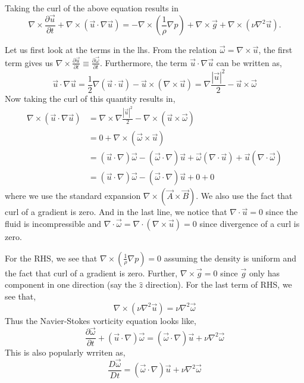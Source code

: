 \documentclass[aps,pra,a4paper,twocolumn,longbibliography,groupedaddress]{revtex4-2}
\begin{document}
Taking the curl of the above equation results in
\begin{equation}
    \nabla \times \frac{\partial \vec{u}}{\partial t} + \nabla \times (\vec{u} \cdot \nabla \vec{u}) = -\nabla \times (\frac{1}{\rho}\nabla p) + \nabla \times \vec{g} + \nabla \times (\nu\nabla^2 \vec{u}).
\end{equation}

Let us first look at the terms in the \gls{lhs}. From the relation $\vec{\omega} = \nabla \times \vec{u}$, the first term gives us $\nabla \times \frac{\partial \vec{u}}{\partial t} \equiv \frac{\partial \vec{\omega}}{\partial t}$. Furthermore, the term $\vec{u} \cdot \nabla \vec{u}$ can be written as,
\begin{equation}
    \vec{u} \cdot \nabla \vec{u} = \frac{1}{2} \nabla (\vec{u}\cdot \vec{u}) - \vec{u} \times (\nabla \times \vec{u}) = \nabla\frac{|\vec{u}|^2}{2} - \vec{u}\times \vec{\omega}
\end{equation}
Now taking the curl of this quantity results in,
\begin{equation}
\begin{split}
     \nabla \times (\vec{u} \cdot \nabla \vec{u}) &= \nabla \times \nabla\frac{|\vec{u}|^2}{2} - \nabla \times (\vec{u}\times \vec{\omega}) \\
     &= 0 + \nabla \times (\vec{\omega} \times \vec{u}) \\
     &= (\vec{u} \cdot \nabla)\vec{\omega} - (\vec{\omega} \cdot \nabla)\vec{u} + \vec{\omega}(\nabla \cdot \vec{u}) + \vec{u}(\nabla \cdot \vec{\omega})\\
     &= (\vec{u} \cdot \nabla)\vec{\omega} - (\vec{\omega} \cdot \nabla)\vec{u} + 0 + 0
\end{split}
\end{equation}
where we use the standard expansion $\nabla \times (\vec{A} \times \vec{B})$. We also use the fact that curl of a gradient is zero.  And in the last line, we notice that $\nabla \cdot \vec{u} = 0$ since the fluid is incompressible and $\nabla \cdot \vec{\omega} = \nabla \cdot (\nabla \times \vec{u}) = 0$ since divergence of a curl is zero.

For the RHS, we see that $\nabla \times (\frac{1}{\rho}\nabla p) = 0$ assuming the density is uniform and the fact that curl of a gradient is zero. Further, $\nabla \times \vec{g} = 0$ since $\vec{g}$ only has component in one direction (say the $\hat{z}$ direction). For the last term of RHS, we see that,
\begin{equation}
    \nabla \times (\nu \nabla^2\vec{u}) = \nu \nabla^2 \vec{\omega}
\end{equation}
Thus the Navier-Stokes vorticity equation looks like,
\begin{equation}
    \frac{\partial \vec{\omega}}{\partial t} + (\vec{u} \cdot \nabla)\vec{\omega} = (\vec{\omega}\cdot \nabla)\vec{u} + \nu\nabla^2\vec{\omega}
\end{equation}
This is also popularly wrriten as,
\begin{equation}
    \frac{D\vec{\omega}}{Dt} = (\vec{\omega}\cdot \nabla)\vec{u} + \nu\nabla^2\vec{\omega}
\end{equation}
\end{document}
